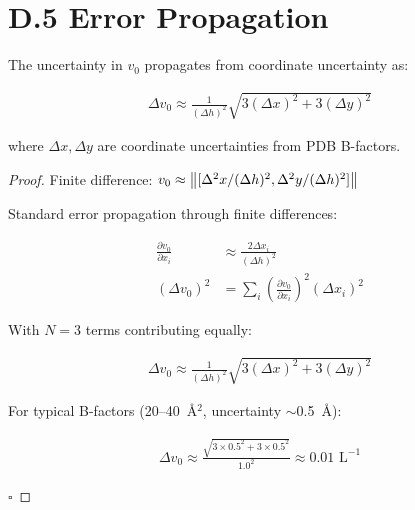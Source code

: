 \section{D.5 Error Propagation}

\begin{theorem}
The uncertainty in $v_0$ propagates from coordinate uncertainty as:

\begin{align}
    \Delta v_0 \approx \frac{1}{(\Delta h)^2} \sqrt{3(\Delta x)^2 + 3(\Delta y)^2}
\end{align}

where $\Delta x, \Delta y$ are coordinate uncertainties from PDB B-factors.
\end{theorem}

\begin{proof}
Finite difference: $v_0 \approx \left\lVert[\Delta^2 x / (\Delta h)^2, \Delta^2 y / (\Delta h)^2]\right\rVert$

Standard error propagation through finite differences:

\begin{align}
    \frac{\partial v_0}{\partial x_i} &\approx \frac{2\Delta x_i}{(\Delta h)^2} \\
    (\Delta v_0)^2 &= \sum_i (\frac{\partial v_0}{\partial x_i})^2 (\Delta x_i)^2
\end{align}

With $N=3$ terms contributing equally:

\begin{align}
    \Delta v_0 \approx \frac{1}{(\Delta h)^2} \sqrt{3(\Delta x)^2 + 3(\Delta y)^2}
\end{align}

For typical B-factors (20--40~\AA{}$^2$, uncertainty $\sim$0.5~\AA{}):

\begin{align}
    \Delta v_0 \approx \frac{\sqrt{3 \times 0.5^2 + 3 \times 0.5^2}}{1.0^2} \approx 0.01 \text{ L}^{-1}
\end{align}

$\square$
\end{proof}



